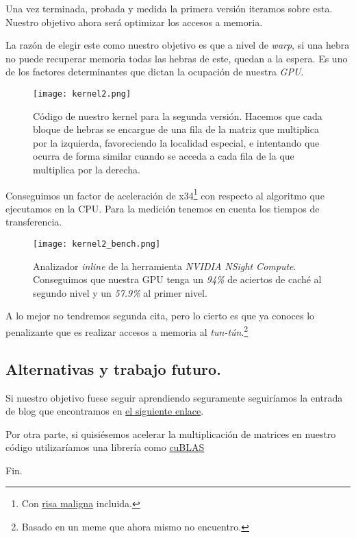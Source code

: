Una vez terminada, probada y medida la primera versión iteramos sobre esta. Nuestro objetivo ahora será optimizar los
accesos a memoria.

La razón de elegir este como nuestro objetivo es que a nivel de \textit{warp}, si una hebra no puede recuperar memoria
todas las hebras de este, quedan a la espera. Es uno de los factores determinantes que dictan la ocupación de nuestra \textit{GPU}.

\begin{figure}[H]
    \centering
    \texttt{[image: kernel2.png]}
    \caption{Código de nuestro kernel para la segunda versión. Hacemos que cada bloque de hebras se encargue de una fila
    de la matriz que multiplica por la izquierda, favoreciendo la localidad especial, e intentando que ocurra de forma
    similar cuando se acceda a cada fila de la que multiplica por la derecha.}
\end{figure}

Conseguimos un factor de aceleración de x34\footnote{Con \href{https://www.youtube.com/watch?v=uC9d34cU2s8&t=73s}{risa maligna} incluida.} con respecto al algoritmo que ejecutamos en la CPU.
Para la medición tenemos en cuenta los tiempos de transferencia.

\begin{figure}[H]
    \centering
    \texttt{[image: kernel2\_bench.png]}
    \caption{Analizador \textit{inline} de la herramienta \textit{NVIDIA NSight Compute}. Conseguimos que nuestra GPU tenga un \textit{94\%} de aciertos de caché al segundo
    nivel y un \textit{57.9\%} al primer nivel.}
\end{figure}

A lo mejor no tendremos segunda cita, pero lo cierto es que ya conoces lo penalizante que es realizar
accesos a memoria al \textit{tun-tún}.\footnote{Basado en un meme que ahora mismo no encuentro.}

\subsection{Alternativas y trabajo futuro.}

Si nuestro objetivo fuese seguir aprendiendo seguramente seguiríamos la entrada de blog que encontramos en \href{https://siboehm.com/articles/22/CUDA-MMM}{el siguiente enlace}.

Por otra parte, si quisiésemos acelerar la multiplicación de matrices en nuestro código utilizaríamos una librería como \href{https://docs.nvidia.com/cuda/cublas/}{cuBLAS}

Fin.
